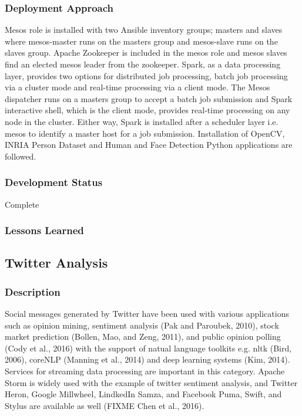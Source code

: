 \documentclass[9pt,twocolumn,twoside]{styles/osajnl}
\begin{document}
\subsubsection{Deployment Approach}

Mesos role is installed with two Ansible inventory groups; masters and
slaves where mesos-master runs on the masters group and mesos-slave
runs on the slaves group. Apache Zookeeper is included in the mesos
role and mesos slaves find an elected mesos leader from the
zookeeper. Spark, as a data processing layer, provides two options for
distributed job processing, batch job processing via a cluster mode
and real-time processing via a client mode. The Mesos dispatcher runs
on a masters group to accept a batch job submission and Spark
interactive shell, which is the client mode, provides real-time
processing on any node in the cluster. Either way, Spark is installed
after a scheduler layer i.e. mesos to identify a master host for a job
submission. Installation of OpenCV, INRIA Person Dataset and Human and
Face Detection Python applications are followed.

\subsubsection{Development Status}

Complete

\subsubsection{Lessons Learned}


\subsection{Twitter Analysis}

\subsubsection{Description}

Social messages generated by Twitter have been used with various
applications such as opinion mining, sentiment analysis (Pak and
Paroubek, 2010), stock market prediction (Bollen, Mao, and Zeng,
2011), and public opinion polling (Cody et al., 2016) with the support
of natual language toolkits e.g. nltk (Bird, 2006), coreNLP (Manning
et al., 2014) and deep learning systems (Kim, 2014). Services for
streaming data processing are important in this category. Apache Storm
is widely used with the example of twitter sentiment analysis, and
Twitter Heron, Google Millwheel, LindkedIn Samza, and Facebook Puma,
Swift, and Stylus are available as well (FIXME Chen et al., 2016).
\end{document}
